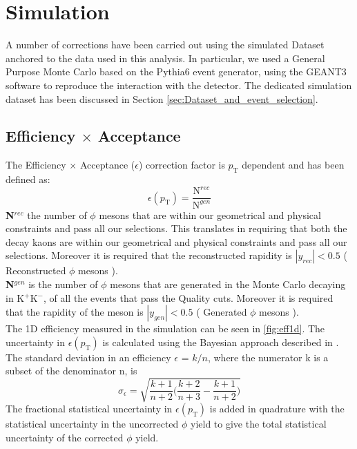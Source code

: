 \section{Simulation}
\label{sec:Simulation}
A number of corrections have been carried out using the simulated Dataset anchored to the data used in this analysis. In particular, we used a General Purpose Monte Carlo based on the Pythia6 event generator, using the GEANT3 software to reproduce the interaction with the detector. The dedicated simulation dataset has been discussed in Section \ref{sec:Dataset_and_event_selection}.\\

\subsection{Efficiency $\times$ Acceptance}
The Efficiency $\times$ Acceptance ($\epsilon$) correction factor is $p_{\text{T}}$ dependent and has been defined as:
\begin{equation}
\epsilon(p_{\text{T}}) = \frac{\text{N}^{rec}}{\text{N}^{gen}}
\label{eq:eff}
\end{equation}
\textbf{N$^{rec}$} the number of $\phi$ mesons that are within our geometrical and physical constraints and pass all our selections. This translates in requiring that both the decay kaons are within our geometrical and physical constraints and pass all our selections. Moreover it is required that the reconstructed rapidity is $|y_{rec}|<0.5$ ( Reconstructed $\phi$ mesons ).\\
\textbf{N$^{gen}$} is the number of $\phi$ mesons that are generated in the Monte Carlo decaying in K$^+$K$^-$, of all the events that pass the Quality cuts. Moreover it is required that the rapidity of the meson is $|y_{gen}|<0.5$ ( Generated $\phi$ mesons ).\\
The 1D efficiency measured in the simulation can be seen in \ref{fig:eff1d}. The uncertainty in $\epsilon(p_{\text{T}})$ is calculated using the Bayesian approach described in \cite{ErrEff}. The standard deviation in an efficiency $\epsilon$ = $k/n$, where the numerator k is a subset of the denominator n, is
\begin{equation}
\sigma_{\epsilon}=\sqrt{\frac{k+1}{n+2}\Big( \frac{k+2}{n+3} - \frac{k+1}{n+2} \Big)}
\end{equation}
The fractional statistical uncertainty in $\epsilon(p_{\text{T}})$ is added in quadrature with the statistical uncertainty in the uncorrected $\phi$ yield to give the total statistical uncertainty of the corrected $\phi$ yield.
